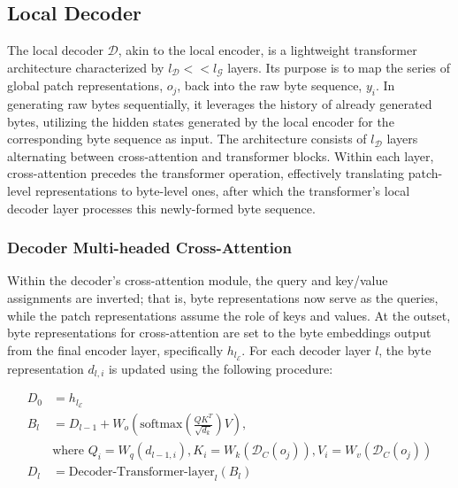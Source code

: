 \subsection{Local Decoder} 

The local decoder $\mathcal{D}$, akin to the local encoder, is a lightweight transformer architecture characterized by $l_{\mathcal{D}} << l_{\mathcal{G}}$ layers. Its purpose is to map the series of global patch representations, $o_j$, back into the raw byte sequence, $y_i$. In generating raw bytes sequentially, it leverages the history of already generated bytes, utilizing the hidden states generated by the local encoder for the corresponding byte sequence as input. The architecture consists of $l_{\mathcal{D}}$ layers alternating between cross-attention and transformer blocks. Within each layer, cross-attention precedes the transformer operation, effectively translating patch-level representations to byte-level ones, after which the transformer's local decoder layer processes this newly-formed byte sequence.

\subsubsection{Decoder Multi-headed Cross-Attention} 

Within the decoder’s cross-attention module, the query and key/value assignments are inverted; that is, byte representations now serve as the queries, while the patch representations assume the role of keys and values. At the outset, byte representations for cross-attention are set to the byte embeddings output from the final encoder layer, specifically $h_{l_{\mathcal{E}}}$. For each decoder layer $l$, the byte representation $d_{l,i}$ is updated using the following procedure:

\begin{align}
D_0 &= h_{l_{\mathcal{E}}} \\
B_l &= D_{l-1} + W_o\left(\text{softmax}\left(\frac{QK^T}{\sqrt{d_k}}\right)V\right), \\
  &\text{where } Q_i = W_q(d_{l-1,i}), K_i = W_k(\mathcal{D}_C(o_j)), V_i = W_v(\mathcal{D}_C(o_j)) \\
  D_l &= \text{Decoder-Transformer-layer}_l(B_l)
\end{align}

